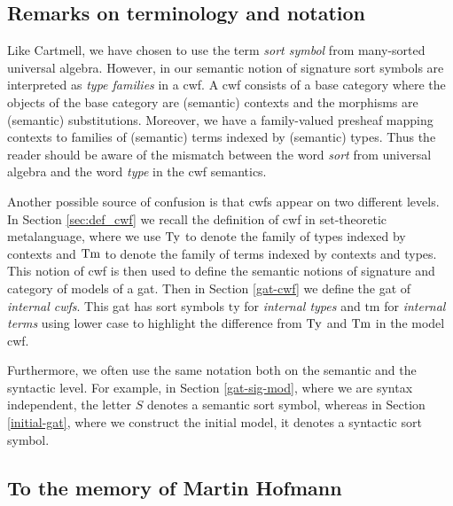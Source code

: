 \documentclass{lmcs}
\newcommand{\ty}{\mathrm{ty}}
\newcommand{\tm}{\mathrm{tm}}
\begin{document}

\subsection*{Remarks on terminology and notation}
Like Cartmell, we have chosen to use the term {\em sort symbol} from many-sorted universal algebra. However, in our semantic notion of signature sort symbols are interpreted as {\em type families} in a cwf. A cwf consists of a base category where the objects of the base category are (semantic) contexts and the morphisms are (semantic) substitutions. Moreover, we have a family-valued presheaf mapping contexts to families of (semantic) terms indexed by (semantic) types. Thus the reader should be aware of the mismatch between the word {\em sort} from universal algebra and the word {\em type} in the cwf semantics.

Another possible source of confusion is that cwfs appear on two different levels. In Section \ref{sec:def_cwf} we recall the definition of cwf in set-theoretic metalanguage, where we use $\mathrm{Ty}$ to denote the family of types indexed by contexts and $\mathrm{Tm}$ to denote the family of terms indexed by contexts and types. This notion of cwf is then used to define the semantic notions of signature and category of models of a gat. Then in Section \ref{gat-cwf} we define the gat of {\em internal cwfs}. This gat has sort symbols $\ty$ for {\em internal types} and $\tm$ for {\em internal terms} using lower case to highlight the difference from $\mathrm{Ty}$ and $\mathrm{Tm}$ in the model cwf.

Furthermore, we often use the same notation both on the semantic and the syntactic level. For example, in Section \ref{gat-sig-mod},  where we are syntax independent, the letter $S$ denotes a semantic sort symbol, whereas in Section \ref{initial-gat}, where we construct the initial model, it denotes a syntactic sort symbol.

\subsection*{To the memory of Martin Hofmann}
\end{document}
